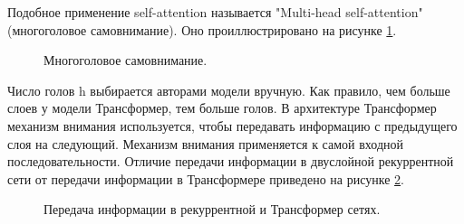 Подобное применение self-attention называется "Multi-head self-attention" (многоголовое самовнимание). Оно проиллюстрировано на рисунке \ref{fig:Transformer2-MultiHeadSelfAttention}.



\begin{figure}[ht]
  \caption{Многоголовое самовнимание.}\label{fig:Transformer2-MultiHeadSelfAttention}
\end{figure}


Число голов h выбирается авторами модели вручную. Как правило, чем больше слоев у модели Трансформер, тем больше голов. 
В архитектуре Трансформер механизм внимания используется, чтобы передавать информацию с предыдущего слоя на следующий. Механизм внимания применяется к самой входной последовательности. Отличие передачи информации в двуслойной рекуррентной сети от передачи информации в Трансформере приведено на рисунке \ref{fig:Transformer3-CompareToRNN}. 


\begin{figure}[ht]
  \caption{Передача информации в рекуррентной и Трансформер сетях.}\label{fig:Transformer3-CompareToRNN}
\end{figure}


